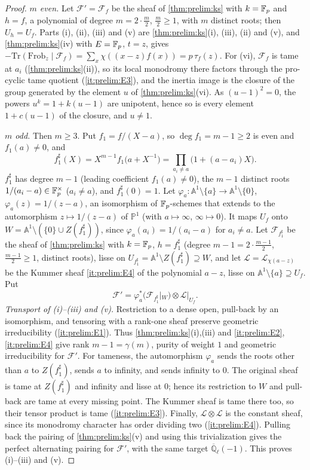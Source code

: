 \begin{proof}
\emph{$m$ even.} Let $\mathcal F'=\mathcal F_f$ be the sheaf of
\cref{thm:prelim:ks} with $k=\mathbb F_p$ and $h=f$, a polynomial of degree
$m=2\cdot\frac m2$, $\frac m2\ge1$, with $m$ distinct roots; then $U_h=U_f$.
Parts (i), (ii), (iii) and (v) are \cref{thm:prelim:ks}(i), (iii), (ii) and
(v), and \cref{thm:prelim:ks}(iv) with $E=\mathbb F_p$, $t=z$, gives
$-\mathrm{Tr}(\mathrm{Frob}_z\mid\mathcal F_f)=\sum_x\chi((x-z)f(x))=p\,\tau_f(z)$.
For (vi), $\mathcal F_f$ is tame at $a_i$ (\cref{thm:prelim:ks}(ii)), so its
local monodromy there factors through the pro-cyclic tame quotient
(\ref{it:prelim:E3}), and the inertia image is the closure of the group
generated by the element $u$ of \cref{thm:prelim:ks}(vi). As $(u-1)^2=0$, the
powers $u^k=1+k(u-1)$ are unipotent, hence so is every element
$1+c(u-1)$ of the closure, and $u\ne1$.

\emph{$m$ odd.} Then $m\ge3$. Put $f_1=f/(X-a)$, so $\deg f_1=m-1\ge2$ is even
and $f_1(a)\ne0$, and
\[
  f_1^\sharp(X)=X^{m-1}f_1\big(a+X^{-1}\big)=\prod_{a_i\ne a}\big(1+(a-a_i)X\big).
\]
$f_1^\sharp$ has degree $m-1$ (leading coefficient $f_1(a)\ne0$), the $m-1$
distinct roots $1/(a_i-a)\in\mathbb F_p^\times$ ($a_i\ne a$), and $f_1^\sharp(0)=1$.
Let $\varphi_a:\mathbb A^1\setminus\{a\}\to\mathbb A^1\setminus\{0\}$,
$\varphi_a(z)=1/(z-a)$, an isomorphism of $\mathbb F_p$-schemes that extends to the
automorphism $z\mapsto1/(z-a)$ of $\mathbb P^1$ (with $a\mapsto\infty$,
$\infty\mapsto0$). It maps $U_f$ onto
$W=\mathbb A^1\setminus(\{0\}\cup Z(f_1^\sharp))$, since
$\varphi_a(a_i)=1/(a_i-a)$ for $a_i\ne a$. Let $\mathcal F_{f_1^\sharp}$ be the
sheaf of \cref{thm:prelim:ks} with $k=\mathbb F_p$, $h=f_1^\sharp$ (degree
$m-1=2\cdot\frac{m-1}2$, $\frac{m-1}2\ge1$, distinct roots), lisse on
$U_{f_1^\sharp}=\mathbb A^1\setminus Z(f_1^\sharp)\supseteq W$, and let
$\mathcal L=\mathcal L_{\chi(a-z)}$ be the Kummer sheaf \ref{it:prelim:E4} of the
polynomial $a-z$, lisse on $\mathbb A^1\setminus\{a\}\supseteq U_f$. Put
\[
  \mathcal F'=\varphi_a^*\big(\mathcal F_{f_1^\sharp}|_W\big)\otimes\mathcal L|_{U_f}.
\]
\emph{Transport of (i)--(iii) and (v).} Restriction to a dense open,
pull-back by an isomorphism, and tensoring with a rank-one sheaf preserve
geometric irreducibility (\ref{it:prelim:E1}). Thus
\cref{thm:prelim:ks}(i),(iii) and \ref{it:prelim:E2}, \ref{it:prelim:E4}
give rank $m-1=\gamma(m)$, purity of weight $1$ and geometric
irreducibility for $\mathcal F'$. For tameness, the automorphism
$\varphi_a$ sends the roots other than $a$ to $Z(f_1^\sharp)$, sends $a$
to infinity, and sends infinity to $0$. The original sheaf is tame at
$Z(f_1^\sharp)$ and infinity and lisse at $0$; hence its restriction to $W$
and pull-back are tame at every missing point. The Kummer sheaf is tame
there too, so their tensor product is tame (\ref{it:prelim:E3}). Finally,
$\mathcal L\otimes\mathcal L$ is the constant sheaf, since its monodromy
character has order dividing two (\ref{it:prelim:E4}). Pulling back the
pairing of \cref{thm:prelim:ks}(v) and using this trivialization gives the
perfect alternating pairing for $\mathcal F'$, with the same target
$\overline{\mathbb Q}_\ell(-1)$. This proves (i)--(iii) and (v).


\end{proof}
